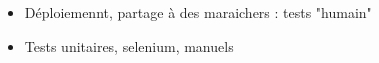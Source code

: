 \begin{itemize}
    \item Déploiemennt, partage à des maraichers : tests "humain"
    \item Tests unitaires, selenium, manuels
\end{itemize}